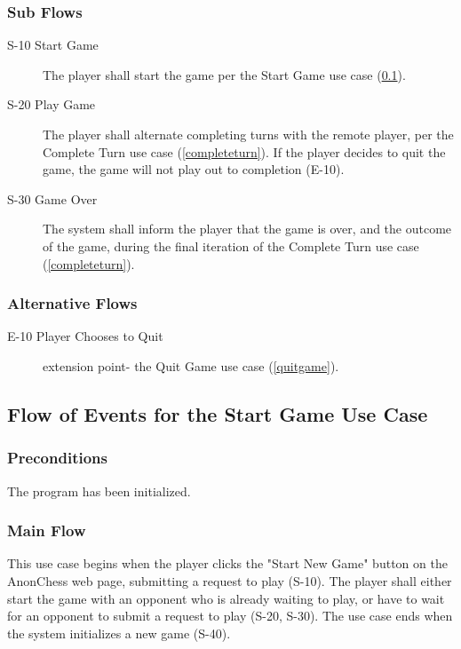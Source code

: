 \subsubsection{Sub Flows}
\begin{description}
\item[S-10 Start Game] The player shall start the game per the Start Game use case (\ref{startgame}). 
\item[S-20 Play Game] The player shall alternate completing turns with the remote player, per the Complete Turn use case (\ref{completeturn}). If the player decides to quit the game, the game will not play out to completion (E-10).
\item[S-30 Game Over] The system shall inform the player that the game is over, and the outcome of the game, during the final iteration of the Complete Turn use case (\ref{completeturn}).  
\end{description}
\subsubsection{Alternative Flows}
\begin{description}
\item[E-10 Player Chooses to Quit] extension point- the Quit Game use case  (\ref{quitgame}).
\end{description}

\subsection{Flow of Events for the Start Game Use Case }
\label{startgame}
\subsubsection{Preconditions}
 The program has been initialized.
\subsubsection{Main Flow}
 This use case begins when the player clicks the "Start New Game" button on the AnonChess web page, submitting a request to play (S-10). The player shall either start the game with an opponent who is already waiting to play, or have to wait for an opponent to submit a request to play (S-20, S-30). The use case ends when the system initializes a new game (S-40).
